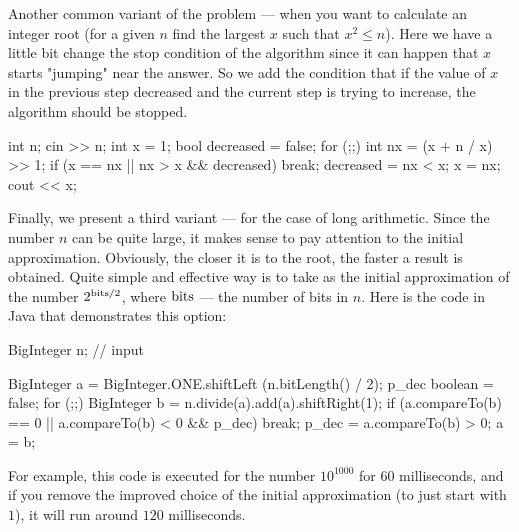 Another common variant of the problem --- when you want to calculate an integer root (for a given $n$ find the largest $x$ such that $x^2 \le n$). Here we have a little bit change the stop condition of the algorithm since it can happen that $x$ starts "jumping" near the answer. So we add the condition that if the value of $x$ in the previous step decreased and the current step is trying to increase, the algorithm should be stopped.

\code
int n;
cin >> n;
int x = 1;
bool decreased = false;
for (;;) {
int nx = (x + n / x) >> 1;
if (x == nx || nx > x && decreased) break;
decreased = nx < x;
x = nx;
}
cout << x;
\endcode

Finally, we present a third variant --- for the case of long arithmetic. Since the number $n$ can be quite large, it makes sense to pay attention to the initial approximation. Obviously, the closer it is to the root, the faster a result is obtained. Quite simple and effective way is to take as the initial approximation of the number $2^{{\rm bits}/2}$, where $\rm bits$ --- the number of bits in $n$. Here is the code in Java that demonstrates this option:

\code
BigInteger n; // input

BigInteger a = BigInteger.ONE.shiftLeft (n.bitLength() / 2);
p_dec boolean = false;
for (;;) {
BigInteger b = n.divide(a).add(a).shiftRight(1);
if (a.compareTo(b) == 0 || a.compareTo(b) < 0 && p_dec) break;
p_dec = a.compareTo(b) > 0;
a = b;
}
\endcode

For example, this code is executed for the number $10^{1000}$ for $60$ milliseconds, and if you remove the improved choice of the initial approximation (to just start with $1$), it will run around $120$ milliseconds.
